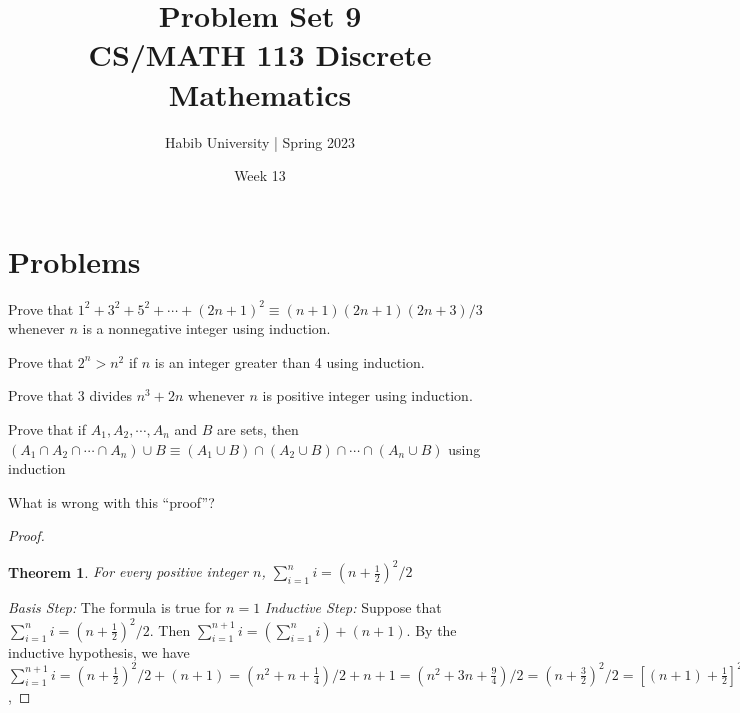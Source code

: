 \documentclass{article}
\newtheorem{theorem}{Theorem}
\newenvironment{problem}[2][Problem]{\begin{trivlist}
\item[\hskip \labelsep {\bfseries #1}\hskip \labelsep {\bfseries #2.}]}{\end{trivlist}}
\begin{document}
\title{Problem Set 9\\CS/MATH 113 Discrete Mathematics}
\author{Habib University | Spring 2023}
\date{Week 13}
\maketitle

\section{Problems}

\begin{problem}{1}[Chapter 5.1, Question 5]
Prove that $1^2 + 3^2 + 5^2 + \cdots + (2n+1)^2 \equiv (n+1)(2n+1)(2n+3)/3$ whenever $n$ is a nonnegative integer using induction.
\end{problem}

\begin{problem}{2}[Chapter 5.1, Question 21]
Prove that $2^n > n^2$ if $n$ is an integer greater than 4 using induction.
\end{problem}

\begin{problem}{3}[Chapter 5.1, Question 32]
    Prove that 3 divides $n^3+2n$ whenever $n$ is positive integer using induction.
\end{problem}

\begin{problem}{4}[Chapter 5.1, Question 40]
    Prove that if $A_1, A_2, \cdots, A_n$ and $B$ are sets, then
    $(A_1 \cap A_2 \cap \cdots \cap A_n) \cup B  \equiv (A_1 \cup B) \cap (A_2 \cup B) \cap \cdots \cap (A_n \cup B)$ using induction
\end{problem}

\begin{problem}{5}[Chapter 5.1, Question 50]
    What is wrong with this ``proof''?
    \begin{proof}
    \begin{theorem}
        For every positive integer $n$, $\sum_{i=1}^{n} i = (n+\frac{1}{2})^2 / 2$
    \end{theorem}
    \textit{Basis Step: } The formula is true for $n=1$
    \newline
    \textit{Inductive Step: } Suppose that $\sum_{i=1}^{n} i = (n+\frac{1}{2})^2 / 2$.
    Then $\sum_{i=1}^{n+1} i = (\sum_{i=1}^{n} i) + (n+1)  $. By the inductive hypothesis, we have 
    $\sum_{i=1}^{n+1} i = (n+\frac{1}{2})^2 / 2 + (n+1) = (n^2 + n + \frac{1}{4})/2 + n + 1 = (n^2 + 3n + \frac{9}{4})/2= (n+\frac{3}{2})^2 /2 = [(n+1)+\frac{1}{2}]^2 /2$, 
    
       
    \end{proof}
\end{problem}
\end{document}
